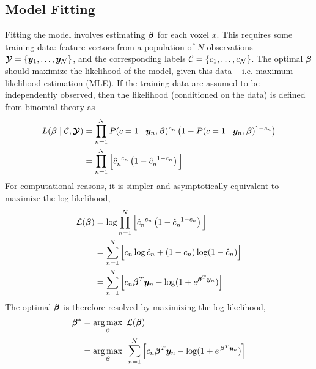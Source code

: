 \subsection{Model Fitting}
Fitting the model involves estimating $\bm{\beta}$ for each voxel $x$. This requires some training data: feature vectors from a population of $N$ observations $\bm{\mathcal{Y}} = \{\bm{y}_1,\dots,\bm{y}_{\mathcal{N}}\}$, and the corresponding labels $\mathcal{C} = \{c_1,\dots,c_{\mathcal{N}}\}$. The optimal $\bm{\beta}$ should maximize the likelihood of the model, given this data -- i.e. maximum likelihood estimation (MLE). If the training data are assumed to be independently observed, then the likelihood (conditioned on the data) is defined from binomial theory as 
\begin{align}
  L(\bm{\beta}\mid\mathcal{C},\bm{\mathcal{Y}}) &= \prod_{n=1}^{N} P(c=1\mid\bm{y}_n,\bm{\beta})^{c_n} \left(1-P(c=1\mid\bm{y}_n,\bm{\beta})^{1-c_n}\right)\nonumber\\
  &= \prod_{n=1}^{N} \Big[\hat{c}_n^{\enspace c_n} \left(1-\hat{c}_n^{\enspace 1-c_n}\right)\Big]
  \label{eq:likelihood}
\end{align}
For computational reasons, it is simpler and asymptotically equivalent to maximize the log-likelihood,
\begin{align}
\mathcal{L}(\bm{\beta}) &= \log{ \prod_{n=1}^{N} \Big[\hat{c}_n^{\enspace c_n} \left(1-\hat{c}_n^{\enspace1-c_n}\right)\Big] }\nonumber\\
&= \sum_{n=1}^{N} \Big[ c_n \log \hat{c}_n + (1-c_n) \log (1-\hat{c}_n) \Big] \nonumber\\
&= \sum_{n=1}^{N} \Big[ c_n \bm{\beta}^T\bm{y}_n - \log (1+e^{\bm{\beta}^T\bm{y}_n}) \Big] 
\label{eq:loglikelihood}
\end{align}
The optimal $\bm{\beta}$ is therefore resolved by maximizing the log-likelihood,
\begin{align}
\bm{\beta}^* &= \underset{\bm{\beta}}{\arg\max} \enspace\mathcal{L}(\bm{\beta})\nonumber\\
&= \underset{\bm{\beta}}{\arg\max}\enspace\sum_{n=1}^{N} \Big[ c_n \bm{\beta}^T\bm{y}_n - \log (1+e^{\thinspace\bm{\beta}^T\bm{y}_n}) \Big]
\label{eq:argmaxmle}
\end{align}
